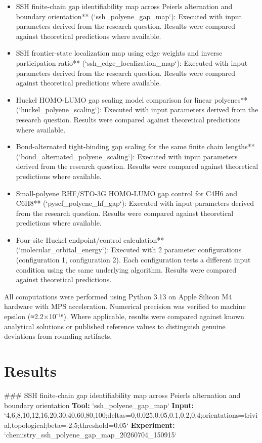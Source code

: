 \documentclass[11pt,a4paper]{article}
\begin{document}
\begin{itemize}
\item SSH finite-chain gap identifiability map across Peierls alternation and boundary orientation** (`ssh\_polyene\_gap\_map`): Executed with input parameters derived from the research question. Results were compared against theoretical predictions where available.
\item SSH frontier-state localization map using edge weights and inverse participation ratio** (`ssh\_edge\_localization\_map`): Executed with input parameters derived from the research question. Results were compared against theoretical predictions where available.
\item Huckel HOMO-LUMO gap scaling model comparison for linear polyenes** (`huckel\_polyene\_scaling`): Executed with input parameters derived from the research question. Results were compared against theoretical predictions where available.
\item Bond-alternated tight-binding gap scaling for the same finite chain lengths** (`bond\_alternated\_polyene\_scaling`): Executed with input parameters derived from the research question. Results were compared against theoretical predictions where available.
\item Small-polyene RHF/STO-3G HOMO-LUMO gap control for C4H6 and C6H8** (`pyscf\_polyene\_hf\_gap`): Executed with input parameters derived from the research question. Results were compared against theoretical predictions where available.
\item Four-site Huckel endpoint/control calculation** (`molecular\_orbital\_energy`): Executed with 2 parameter configurations (configuration 1, configuration 2). Each configuration tests a different input condition using the same underlying algorithm. Results were compared against theoretical predictions.
\end{itemize}
All computations were performed using Python 3.13 on Apple Silicon M4 hardware with MPS acceleration. Numerical precision was verified to machine epsilon (≈2.2×10⁻¹⁶). Where applicable, results were compared against known analytical solutions or published reference values to distinguish genuine deviations from rounding artifacts.


\section{Results}
\#\#\# SSH finite-chain gap identifiability map across Peierls alternation and boundary orientation
\textbf{Tool:} `ssh\_polyene\_gap\_map`
\textbf{Input:} `4,6,8,10,12,16,20,30,40,60,80,100;deltas=0,0.025,0.05,0.1,0.2,0.4;orientations=trivial,topological;beta=-2.5;threshold=0.05`
\textbf{Experiment:} `chemistry\_ssh\_polyene\_gap\_map\_20260704\_150915`
\end{document}
